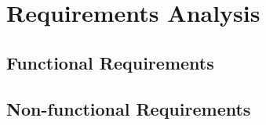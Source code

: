 \clearpage
\section{Requirements Analysis}
\subsection{Functional Requirements}
\subsection{Non-functional Requirements}